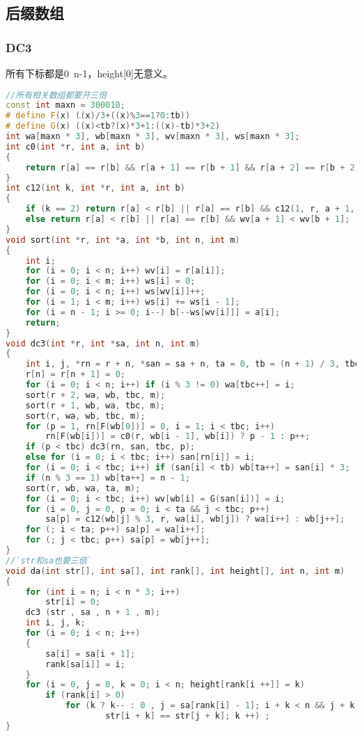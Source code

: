 \subsection{后缀数组}
	\subsubsection{DC3}
		所有下标都是0~n-1，height[0]无意义。
		\begin{lstlisting}[language=c++]
//所有相关数组都要开三倍
const int maxn = 300010;
# define F(x) ((x)/3+((x)%3==1?0:tb))
# define G(x) ((x)<tb?(x)*3+1:((x)-tb)*3+2)
int wa[maxn * 3], wb[maxn * 3], wv[maxn * 3], ws[maxn * 3];
int c0(int *r, int a, int b)
{
	return r[a] == r[b] && r[a + 1] == r[b + 1] && r[a + 2] == r[b + 2];
}
int c12(int k, int *r, int a, int b)
{
	if (k == 2) return r[a] < r[b] || r[a] == r[b] && c12(1, r, a + 1, b + 1);
	else return r[a] < r[b] || r[a] == r[b] && wv[a + 1] < wv[b + 1];
}
void sort(int *r, int *a, int *b, int n, int m)
{
	int i;
	for (i = 0; i < n; i++) wv[i] = r[a[i]];
	for (i = 0; i < m; i++) ws[i] = 0;
	for (i = 0; i < n; i++) ws[wv[i]]++;
	for (i = 1; i < m; i++) ws[i] += ws[i - 1];
	for (i = n - 1; i >= 0; i--) b[--ws[wv[i]]] = a[i];
	return;
}
void dc3(int *r, int *sa, int n, int m)
{
	int i, j, *rn = r + n, *san = sa + n, ta = 0, tb = (n + 1) / 3, tbc = 0, p;
	r[n] = r[n + 1] = 0;
	for (i = 0; i < n; i++) if (i % 3 != 0) wa[tbc++] = i;
	sort(r + 2, wa, wb, tbc, m);
	sort(r + 1, wb, wa, tbc, m);
	sort(r, wa, wb, tbc, m);
	for (p = 1, rn[F(wb[0])] = 0, i = 1; i < tbc; i++)
		rn[F(wb[i])] = c0(r, wb[i - 1], wb[i]) ? p - 1 : p++;
	if (p < tbc) dc3(rn, san, tbc, p);
	else for (i = 0; i < tbc; i++) san[rn[i]] = i;
	for (i = 0; i < tbc; i++) if (san[i] < tb) wb[ta++] = san[i] * 3;
	if (n % 3 == 1) wb[ta++] = n - 1;
	sort(r, wb, wa, ta, m);
	for (i = 0; i < tbc; i++) wv[wb[i] = G(san[i])] = i;
	for (i = 0, j = 0, p = 0; i < ta && j < tbc; p++)
		sa[p] = c12(wb[j] % 3, r, wa[i], wb[j]) ? wa[i++] : wb[j++];
	for (; i < ta; p++) sa[p] = wa[i++];
	for (; j < tbc; p++) sa[p] = wb[j++];
}
//`str和sa也要三倍`
void da(int str[], int sa[], int rank[], int height[], int n, int m)
{
	for (int i = n; i < n * 3; i++)
		str[i] = 0;
	dc3 (str , sa , n + 1 , m);
	int i, j, k;
	for (i = 0; i < n; i++)
	{
		sa[i] = sa[i + 1];
		rank[sa[i]] = i;
	}
	for (i = 0, j = 0, k = 0; i < n; height[rank[i ++]] = k)
		if (rank[i] > 0)
			for (k ? k-- : 0 , j = sa[rank[i] - 1]; i + k < n && j + k < n &&
					str[i + k] == str[j + k]; k ++) ;
}
		\end{lstlisting}
		
